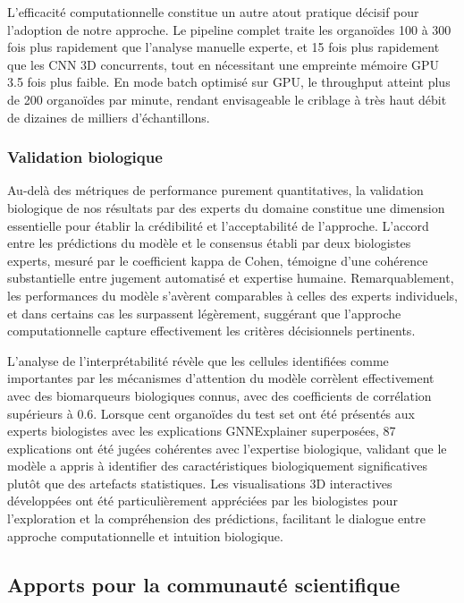 L'efficacité computationnelle constitue un autre atout pratique décisif pour l'adoption de notre approche. Le pipeline complet traite les organoïdes 100 à 300 fois plus rapidement que l'analyse manuelle experte, et 15 fois plus rapidement que les CNN 3D concurrents, tout en nécessitant une empreinte mémoire GPU 3.5 fois plus faible. En mode batch optimisé sur GPU, le throughput atteint plus de 200 organoïdes par minute, rendant envisageable le criblage à très haut débit de dizaines de milliers d'échantillons.

\subsubsection{Validation biologique}

Au-delà des métriques de performance purement quantitatives, la validation biologique de nos résultats par des experts du domaine constitue une dimension essentielle pour établir la crédibilité et l'acceptabilité de l'approche. L'accord entre les prédictions du modèle et le consensus établi par deux biologistes experts, mesuré par le coefficient kappa de Cohen, témoigne d'une cohérence substantielle entre jugement automatisé et expertise humaine. Remarquablement, les performances du modèle s'avèrent comparables à celles des experts individuels, et dans certains cas les surpassent légèrement, suggérant que l'approche computationnelle capture effectivement les critères décisionnels pertinents.

L'analyse de l'interprétabilité révèle que les cellules identifiées comme importantes par les mécanismes d'attention du modèle corrèlent effectivement avec des biomarqueurs biologiques connus, avec des coefficients de corrélation supérieurs à 0.6. Lorsque cent organoïdes du test set ont été présentés aux experts biologistes avec les explications GNNExplainer superposées, 87 explications ont été jugées cohérentes avec l'expertise biologique, validant que le modèle a appris à identifier des caractéristiques biologiquement significatives plutôt que des artefacts statistiques. Les visualisations 3D interactives développées ont été particulièrement appréciées par les biologistes pour l'exploration et la compréhension des prédictions, facilitant le dialogue entre approche computationnelle et intuition biologique.

\subsection{Apports pour la communauté scientifique}

